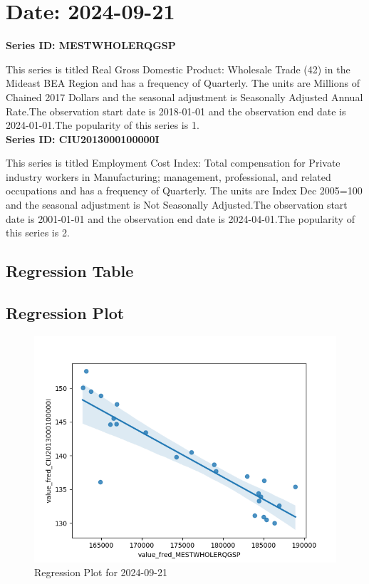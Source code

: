 \section{Date: 2024-09-21}
\noindent \textbf{Series ID: MESTWHOLERQGSP} 

\noindent This series is titled Real Gross Domestic Product: Wholesale Trade (42) in the Mideast BEA Region and has a frequency of Quarterly. The units are Millions of Chained 2017 Dollars and the seasonal adjustment is Seasonally Adjusted Annual Rate.The observation start date is 2018-01-01 and the observation end date is 2024-01-01.The popularity of this series is 1. \\ 

\noindent \textbf{Series ID: CIU2013000100000I} 

\noindent This series is titled Employment Cost Index: Total compensation for Private industry workers in Manufacturing; management, professional, and related occupations and has a frequency of Quarterly. The units are Index Dec 2005=100 and the seasonal adjustment is Not Seasonally Adjusted.The observation start date is 2001-01-01 and the observation end date is 2024-04-01.The popularity of this series is 2. \\ 

\subsection{Regression Table}


\subsection{Regression Plot}
\begin{figure}
\centering
\includegraphics[scale = 0.9]{plots/plot_2024-09-21.png}
\caption{Regression Plot for 2024-09-21}
\end{figure}
\newpage
